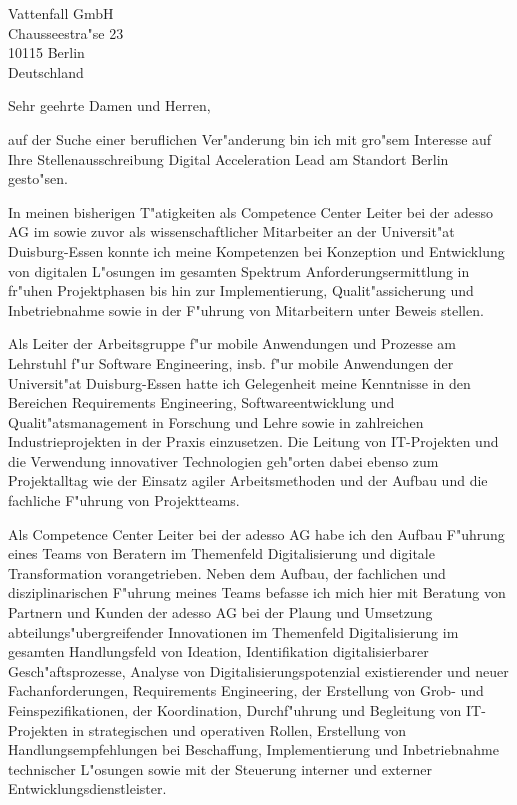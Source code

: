 \documentclass[10pt,a4paper]{dinbrief}
\date{\today}
\begin{document}
 
\begin{letter}  
{%
	Vattenfall GmbH\\
	Chausseestra"se 23\\ 
	10115 Berlin\\
	Deutschland
}
\subject{\bf Bewerbung Digital Acceleration Lead}
\opening{Sehr geehrte Damen und Herren,}
auf der Suche einer beruflichen Ver"anderung bin ich mit gro"sem Interesse auf Ihre Stellenausschreibung Digital Acceleration Lead am Standort Berlin gesto"sen. 

In meinen bisherigen T"atigkeiten als Competence Center Leiter bei der adesso AG im sowie zuvor als wissenschaftlicher Mitarbeiter an der Universit"at Duisburg-Essen konnte ich meine Kompetenzen bei Konzeption und Entwicklung von digitalen L"osungen im gesamten Spektrum Anforderungsermittlung in fr"uhen Projektphasen bis hin zur Implementierung, Qualit"assicherung und Inbetriebnahme sowie in der F"uhrung von Mitarbeitern unter Beweis stellen.

Als Leiter der Arbeitsgruppe f"ur mobile Anwendungen und Prozesse am Lehrstuhl f"ur Software Engineering, insb. f"ur mobile Anwendungen der Universit"at Duisburg-Essen hatte ich Gelegenheit meine Kenntnisse in den Bereichen Requirements Engineering, Softwareentwicklung  und Qualit"atsmanagement in Forschung und Lehre sowie in zahlreichen Industrieprojekten in der Praxis einzusetzen. Die Leitung von IT-Projekten und die Verwendung innovativer Technologien geh"orten dabei ebenso zum Projektalltag wie der Einsatz agiler Arbeitsmethoden und der Aufbau und die fachliche  F"uhrung von Projektteams.

Als Competence Center Leiter bei der adesso AG habe ich den Aufbau F"uhrung eines Teams von Beratern im Themenfeld Digitalisierung und digitale Transformation vorangetrieben. Neben dem Aufbau, der fachlichen und disziplinarischen F"uhrung meines Teams befasse ich mich hier mit Beratung von Partnern und Kunden der adesso AG bei der Plaung und Umsetzung abteilungs"ubergreifender Innovationen im Themenfeld Digitalisierung im gesamten Handlungsfeld von Ideation, Identifikation digitalisierbarer Gesch"aftsprozesse, Analyse von Digitalisierungspotenzial existierender und neuer Fachanforderungen, Requirements Engineering, der Erstellung von Grob- und Feinspezifikationen, der Koordination, Durchf"uhrung und Begleitung von IT-Projekten in strategischen und operativen Rollen, Erstellung von Handlungsempfehlungen bei Beschaffung, Implementierung und Inbetriebnahme technischer L"osungen sowie mit der Steuerung interner und externer Entwicklungsdienstleister.\clearpage


\end{letter}
\end{document}
